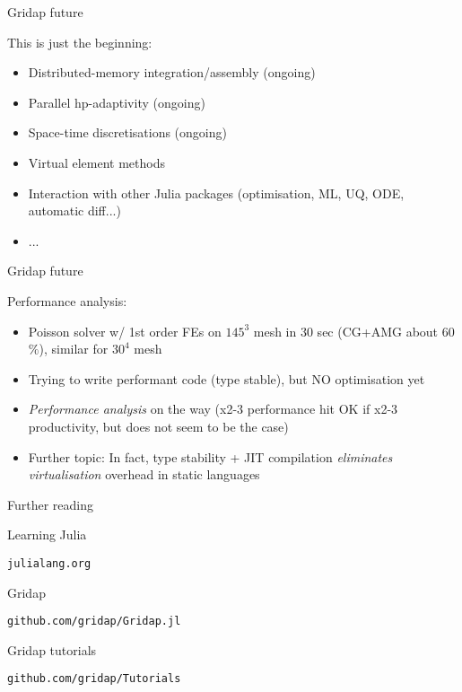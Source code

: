 \begin{frame}{Gridap future}

This is just the beginning:

\begin{itemize}
  \item Distributed-memory integration/assembly (ongoing)
  \item Parallel hp-adaptivity (ongoing)
  \item Space-time discretisations (ongoing)
  \item Virtual element methods
  \item Interaction with other Julia packages (optimisation, ML, UQ, ODE, automatic diff...)
  \item ...
\end{itemize}
\end{frame}

\begin{frame}{Gridap future}

Performance analysis:
\begin{itemize}
  \item Poisson solver w/ 1st order FEs on $145^3$ mesh in $30$ sec (CG+AMG about 60$\%$), similar for $30^4$ mesh
  \item Trying to write performant code (type stable), but NO optimisation yet
  \item \emph{Performance analysis} on the way (x2-3 performance hit OK if x2-3 productivity, but does not seem to be the case)
  \item Further topic: In fact, type stability + JIT compilation \emph{eliminates virtualisation} overhead in static languages
\end{itemize}


\end{frame}

\begin{frame}{Further reading}

  Learning Julia

  \texttt{julialang.org}

  Gridap

  \texttt{github.com/gridap/Gridap.jl}


  Gridap tutorials

  \texttt{github.com/gridap/Tutorials}


  \pause

  \vspace{1cm}


\end{frame}

